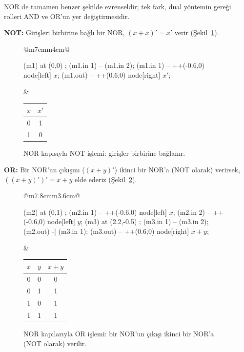NOR de tamamen benzer şekilde evrenseldir; tek fark, dual yöntemin gereği rolleri AND ve
OR'un yer değiştirmesidir.

\textbf{NOT:} Girişleri birbirine bağlı bir NOR, $(x+x)'=x'$ verir
(Şekil~\ref{fig:nor-not}).

\begin{figure}[H]
\centering
\begin{tabular}{@{}m{7cm}m{4cm}@{}}
\begin{circuitikz}[scale=1.3, font=\normalsize]
\node[nor port, number inputs=2] (m1) at (0,0) {};
\draw (m1.in 1) -- (m1.in 2);
\draw (m1.in 1) -- ++(-0.6,0) node[left] {$x$};
\draw (m1.out) -- ++(0.6,0) node[right] {$x'$};
\end{circuitikz}
&
\begin{tabular}{c|c}
\toprule
$x$&$x'$\\
\midrule
0&1\\1&0\\
\bottomrule
\end{tabular}
\end{tabular}
\caption{NOR kapısıyla NOT işlemi: girişler birbirine bağlanır.}
\label{fig:nor-not}
\end{figure}

\textbf{OR:} Bir NOR'un çıkışını ($(x+y)'$) ikinci bir NOR'a (NOT olarak) verirsek,
$((x+y)')'=x+y$ elde ederiz (Şekil~\ref{fig:nor-or}).

\begin{figure}[H]
\centering
\begin{tabular}{@{}m{7.8cm}m{3.6cm}@{}}
\begin{circuitikz}[scale=1.3, font=\normalsize]
\node[nor port, number inputs=2] (m2) at (0,1) {};
\draw (m2.in 1) -- ++(-0.6,0) node[left] {$x$};
\draw (m2.in 2) -- ++(-0.6,0) node[left] {$y$};
\node[nor port, number inputs=2] (m3) at (2.2,-0.5) {};
\draw (m3.in 1) -- (m3.in 2);
\draw (m2.out) -| (m3.in 1);
\draw (m3.out) -- ++(0.6,0) node[right] {$x+y$};
\end{circuitikz}
&
\begin{tabular}{cc|c}
\toprule
$x$&$y$&$x+y$\\
\midrule
0&0&0\\0&1&1\\1&0&1\\1&1&1\\
\bottomrule
\end{tabular}
\end{tabular}
\caption{NOR kapılarıyla OR işlemi: bir NOR'un çıkışı ikinci bir NOR'a (NOT olarak)
verilir.}
\label{fig:nor-or}
\end{figure}


